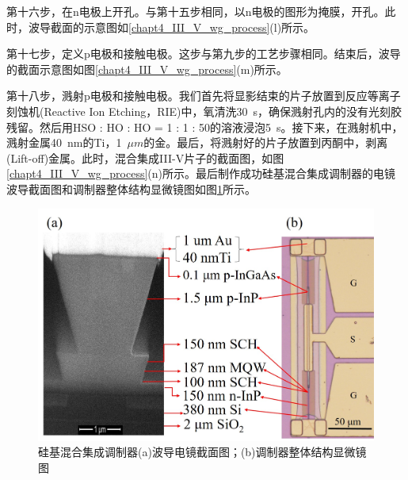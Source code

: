 第十六步，在n电极上开孔。与第十五步相同，以n电极的图形为掩膜，开孔。此时，波导截面的示意图如\ref{chapt4_III_V_wg_process}(l)所示。

第十七步，定义p电极和接触电极。这步与第九步的工艺步骤相同。结束后，波导的截面示意图如图\ref{chapt4_III_V_wg_process}(m)所示。

第十八步，溅射p电极和接触电极。我们首先将显影结束的片子放置到反应等离子刻蚀机(Reactive Ion Etching，RIE)中，氧清洗30~s，确保溅射孔内的没有光刻胶残留。然后用HSO : HO : HO = 1 : 1 : 50的溶液浸泡5~s。接下来，在溅射机中，溅射金属40~nm的Ti，1~$\mu m$的金。最后，将溅射好的片子放置到丙酮中，剥离(Lift-off)金属。此时，混合集成III-V片子的截面图，如图\ref{chapt4_III_V_wg_process}(n)所示。最后制作成功硅基混合集成调制器的电镜波导截面图和调制器整体结构显微镜图如图\ref{chapt4_III_V_results}所示。
\begin{figure}[htb]
	\centering
	\includegraphics[width=12cm]{./Pictures/chapt4_III_V_results.jpg}
	\caption{硅基混合集成调制器(a)波导电镜截面图；(b)调制器整体结构显微镜图}
	\label{chapt4_III_V_results}
\end{figure}

